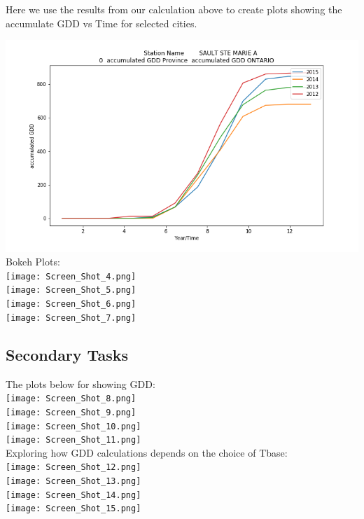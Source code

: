 Here we use the results from our calculation above to create plots showing the accumulate GDD vs Time for selected cities. 

\includegraphics[scale=0.35]{Fig_GDD_50092.png}\\

Bokeh Plots:\\

\texttt{[image: Screen\_Shot\_4.png]}\\
\texttt{[image: Screen\_Shot\_5.png]}\\
\texttt{[image: Screen\_Shot\_6.png]}\\
\texttt{[image: Screen\_Shot\_7.png]}\\
  

\subsection{Secondary Tasks}
The plots below for showing GDD:\\

\texttt{[image: Screen\_Shot\_8.png]}\\
\texttt{[image: Screen\_Shot\_9.png]}\\
\texttt{[image: Screen\_Shot\_10.png]}\\
\texttt{[image: Screen\_Shot\_11.png]}\\

Exploring how GDD calculations depends on the choice of Tbase:\\

\texttt{[image: Screen\_Shot\_12.png]}\\
\texttt{[image: Screen\_Shot\_13.png]}\\
\texttt{[image: Screen\_Shot\_14.png]}\\
\texttt{[image: Screen\_Shot\_15.png]}\\

